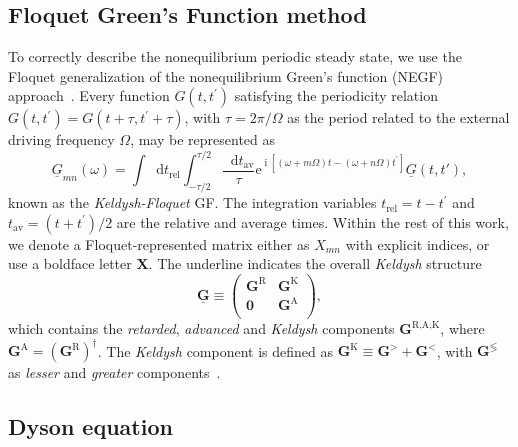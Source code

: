 \documentclass[aps,prb,groupedaddress,showpacs,twocolumn,superscriptaddress,10pt]{revtex4-2}
\newcommand{\ee}{\mathrm{e}}  %
\DeclareMathOperator*{\ii}{i} %
\newcommand*\dd{\mathop{}\!\mathrm{d}}
\newcommand{\mat}[1]{\bm{#1}} %
\newcommand{\kel}[1]{\underline{#1}} %
\begin{document}
\subsection{Floquet Green's Function method}   
\label{sec:GFs_Dyson_Floquet}

To correctly describe the nonequilibrium periodic steady state, we use the Floquet generalization of the nonequilibrium Green's function (NEGF) approach~\cite{ts.ok.08,sc.mo.02u,jo.fr.08}. Every function $G(t,t^{\prime})$ satisfying the periodicity relation $G(t,t^{\prime})=G(t+\tau,t^{\prime}+\tau)$, with $\tau=2\pi/\Omega$ as the period related to the external driving frequency $\Omega$, may be represented as~\cite{ts.ok.08,sc.mo.02u,jo.fr.08}
% 
\begin{equation}
\label{eq:FloquetGF} 
\kel{G}_{mn}(\omega) =\int \dd t_{\text{rel}} \int_{-\tau/2}^{\tau/2} \frac{\dd t_{\text{av}}}{\tau} \ee^{\ii[\left(\omega+m\Omega\right) t -\left( \omega+n\Omega\right)t^{\prime}]} \kel{G}(t,t'),
\end{equation}
% 
known as the \emph{Keldysh-Floquet} GF. The integration variables $t_{\text{rel}} = t-t^{\prime}$ and $t_{\text{av}} = (t+t^{\prime})/2$ are the relative and average times. Within the rest of this work, we denote a Floquet-represented matrix either as $X_{mn}$ with explicit indices, or use a boldface letter $\mat{X}$. The underline indicates the overall \emph{Keldysh} structure
%
\begin{equation}\label{eq:Keld-structure}
\kel{\mat{G}} \equiv
\begin{pmatrix}
\mat{G}^{\text{R}} & \mat{G}^{\text{K}}\\
\mat{0}            & \mat{G}^{\text{A}} \\
\end{pmatrix},
\end{equation}
%
which contains the \emph{retarded}, \emph{advanced} and \emph{Keldysh} components $\mat{G}^{\text{R,A,K}}$, where $\mat{G}^{\text{A}}=(\mat{G}^{\text{R}})^{\dagger}$. The \emph{Keldysh} component is defined as $\mat{G}^{\text{K}} \equiv \mat{G}^{>} + \mat{G}^{<}$, with $\mat{G}^{\lessgtr}$ as \emph{lesser} and \emph{greater} components~\cite{schw.61,keld.65,ra.sm.86,ha.ja}.
  
\subsection{Dyson equation} 
\label{sec:Dyson_equation}
\end{document}
